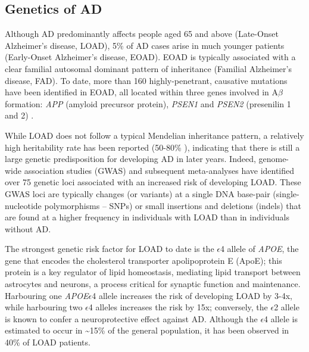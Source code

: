 \newpage
\subsection{Genetics of AD}
Although AD predominantly affects people aged 65 and above (Late-Onset Alzheimer’s disease, LOAD), 5\% of AD cases arise in much younger patients (Early-Onset Alzheimer’s disease, EOAD). EOAD is typically associated with a clear familial autosomal dominant pattern of inheritance (Familial Alzheimer’s disease, FAD)\cite{Jarmolowicz2015}. To date, more than 160 highly-penetrant, causative mutations have been identified in EOAD, all located within three genes involved in A$\beta$ formation: \textit{APP} (amyloid precursor protein), \textit{PSEN1} and \textit{PSEN2} (presenilin 1 and 2) \cite{LM2010,Chai2007}. %

While LOAD does not follow a typical Mendelian inheritance pattern, a relatively high heritability rate has been reported (50-80\% \cite{Gatz2006}), indicating that there is still a large genetic predisposition for developing AD in later years. Indeed, genome-wide association studies (GWAS) and subsequent meta-analyses \cite{Bellenguez2020,Naj2020,Kunkle2019,Jansen2019,Lambert2013,Naj2011,Hollingworth2011,Harold2009,Lambert2009,Bertram2008} have identified over 75 genetic loci associated with an increased risk of developing LOAD. These GWAS loci are typically changes (or variants) at a single DNA base-pair (single-nucleotide polymorphisms – SNPs) or small insertions and deletions (indels) that are found at a higher frequency in individuals with LOAD than in individuals without AD. 

The strongest genetic risk factor for LOAD to date is the $\epsilon$4 allele of \textit{APOE}\cite{Lambert2013}, the gene that encodes the cholesterol transporter apolipoprotein E (ApoE); this protein is a key regulator of lipid homeostasis, mediating lipid transport between astrocytes and neurons, a process critical for synaptic function and maintenance\cite{DH2001}. Harbouring one \textit{APOE}$\epsilon$4 allele increases the risk of developing LOAD by 3-4x, while harbouring two $\epsilon$4 alleles increases the risk by 15x\cite{Farrer1997}; conversely, the $\epsilon$2 allele is known to confer a neuroprotective effect against AD\cite{Nagy1995,EH1994}. Although the $\epsilon$4 allele is estimated to occur in \textasciitilde 15\% of the general population, it has been observed in 40\% of LOAD patients\cite{Farrer1997}. 

